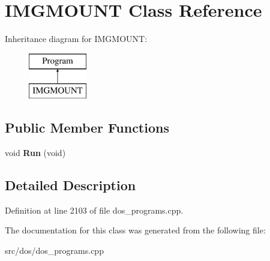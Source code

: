\hypertarget{classIMGMOUNT}{\section{I\-M\-G\-M\-O\-U\-N\-T Class Reference}
\label{classIMGMOUNT}
}
Inheritance diagram for I\-M\-G\-M\-O\-U\-N\-T\-:\begin{figure}[H]
\begin{center}
\leavevmode
\includegraphics[height=2.000000cm]{classIMGMOUNT}
\end{center}
\end{figure}
\subsection*{Public Member Functions}
\begin{DoxyCompactItemize}
\item 
\hypertarget{classIMGMOUNT_abd99efa1dffda2e6f5640ebcd4781852}{void {\bfseries Run} (void)}\label{classIMGMOUNT_abd99efa1dffda2e6f5640ebcd4781852}

\end{DoxyCompactItemize}


\subsection{Detailed Description}


Definition at line 2103 of file dos\-\_\-programs.\-cpp.



The documentation for this class was generated from the following file\-:\begin{DoxyCompactItemize}
\item 
src/dos/dos\-\_\-programs.\-cpp\end{DoxyCompactItemize}

